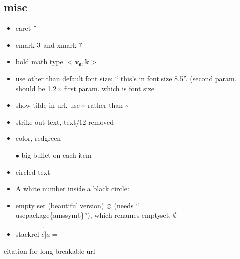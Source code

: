 \subsection{misc}
\begin{itemize}
  \item caret $\textrm{\^{}}$ 
  \item cmark $\cmark$ and xmark $\xmark$
  \item bold math type $\boldsymbol{<v_0, k>}$
  \item use other than default font size: {``\fontsize{8.5}{9} this's in font size 8.5''}. (second param. should be 1.2$\times$ first param. which is font size
  \item show tilde in url, use \textasciitilde{} rather than \~{}
  \item strike out text, \sout{text/$12$ removed}
  \item color, {\color{red}red}{\color{green}green}
  \item[$\bullet$] big bullet on each item
  \item circled text 
  \item A white number inside a black circle: 
  \item empty set (beautiful version) $\varnothing$ (needs ``\\usepackage\{amssymb\}''), which renames emptyset, $\emptyset$
  \item stackrel $\stackrel[c]{a}{=}$
\end{itemize}

citation for long breakable url~\cite{me:mssgx}
